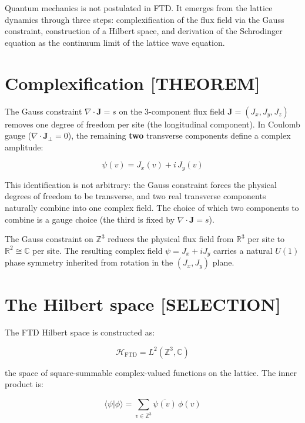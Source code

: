 \documentclass[
  11pt,
  letterpaper,
  twoside,
  openany]{book}
\makeatletter
\let\orig@section\section
\renewcommand{\section}{\needspace{8\baselineskip}\orig@section}
\makeatother
\begin{document}
Quantum mechanics is not postulated in FTD. It emerges from the lattice
dynamics through three steps: complexification of the flux field via the
Gauss constraint, construction of a Hilbert space, and derivation of the
Schrodinger equation as the continuum limit of the lattice wave
equation.

\section{Complexification {[}THEOREM{]}}\label{complexification-theorem}

The Gauss constraint \(\nabla \cdot \mathbf{J} = s\) on the 3-component
flux field \(\mathbf{J} = (J_x, J_y, J_z)\) removes one degree of
freedom per site (the longitudinal component). In Coulomb gauge
(\(\nabla \cdot \mathbf{J}_\perp = 0\)), the remaining \textbf{two}
transverse components define a complex amplitude:

\[
\psi(v) = J_x(v) + i \, J_y(v)
\tag{16.1}
\]

This identification is not arbitrary: the Gauss constraint forces the
physical degrees of freedom to be transverse, and two real transverse
components naturally combine into one complex field. The choice of which
two components to combine is a gauge choice (the third is fixed by
\(\nabla \cdot \mathbf{J} = s\)).

\begin{ftdtheorem}

The Gauss constraint on \(\mathbb{Z}^3\) reduces the physical flux field
from \(\mathbb{R}^3\) per site to \(\mathbb{R}^2 \cong \mathbb{C}\) per
site. The resulting complex field \(\psi = J_x + iJ_y\) carries a
natural \(U(1)\) phase symmetry inherited from rotation in the
\((J_x, J_y)\) plane.

\end{ftdtheorem}

\section{The Hilbert space
{[}SELECTION{]}}\label{the-hilbert-space-selection}

The FTD Hilbert space is constructed as:

\[
\mathcal{H}_{\text{FTD}} = L^2(\mathbb{Z}^3, \mathbb{C})
\tag{16.2}
\]

the space of square-summable complex-valued functions on the lattice.
The inner product is:

\[
\langle \psi | \phi \rangle = \sum_{v \in \mathbb{Z}^3} \overline{\psi(v)} \, \phi(v)
\tag{16.3}
\]
\end{document}
